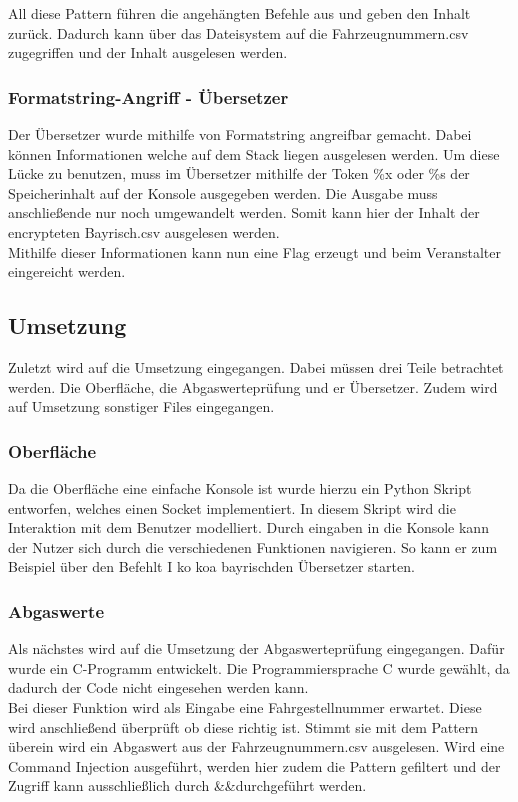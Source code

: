 All diese Pattern führen die angehängten Befehle aus und geben den Inhalt zurück. Dadurch kann über das Dateisystem auf die Fahrzeugnummern.csv zugegriffen und der Inhalt ausgelesen werden. 

\subsubsection{Formatstring-Angriff - Übersetzer}
Der Übersetzer wurde mithilfe von Formatstring angreifbar gemacht. Dabei können Informationen welche auf dem Stack liegen ausgelesen werden.
Um diese Lücke zu benutzen, muss im Übersetzer mithilfe der Token \%x oder \%s der Speicherinhalt auf der Konsole ausgegeben werden. Die Ausgabe muss anschließende nur noch umgewandelt werden. Somit kann hier der Inhalt der encrypteten Bayrisch.csv ausgelesen werden.
\\

Mithilfe dieser Informationen kann nun eine Flag erzeugt und beim Veranstalter eingereicht werden.
\subsection{Umsetzung}
Zuletzt wird auf die Umsetzung eingegangen. Dabei müssen drei Teile betrachtet werden. Die Oberfläche, die Abgaswerteprüfung und er Übersetzer. Zudem wird auf Umsetzung sonstiger Files eingegangen.

\subsubsection{Oberfläche}
Da die Oberfläche eine einfache Konsole ist wurde hierzu ein Python Skript entworfen, welches einen Socket implementiert. In diesem Skript wird die Interaktion mit dem Benutzer modelliert. Durch eingaben in die Konsole kann der Nutzer sich durch die verschiedenen Funktionen navigieren. So kann er zum Beispiel über den Befehlt \glqq I ko koa bayrisch\grqq  den Übersetzer starten.

\subsubsection{Abgaswerte}
Als nächstes wird auf die Umsetzung der Abgaswerteprüfung eingegangen. Dafür wurde ein C-Programm entwickelt. Die Programmiersprache C wurde gewählt, da dadurch der Code nicht eingesehen werden kann. 
\\

Bei dieser Funktion wird als Eingabe eine Fahrgestellnummer erwartet. Diese wird anschließend überprüft ob diese richtig ist. Stimmt sie mit dem Pattern überein wird ein Abgaswert aus der Fahrzeugnummern.csv ausgelesen. 
Wird eine Command Injection ausgeführt, werden hier zudem die Pattern gefiltert und der Zugriff kann ausschließlich durch \glqq \&\&\grqq durchgeführt werden.

